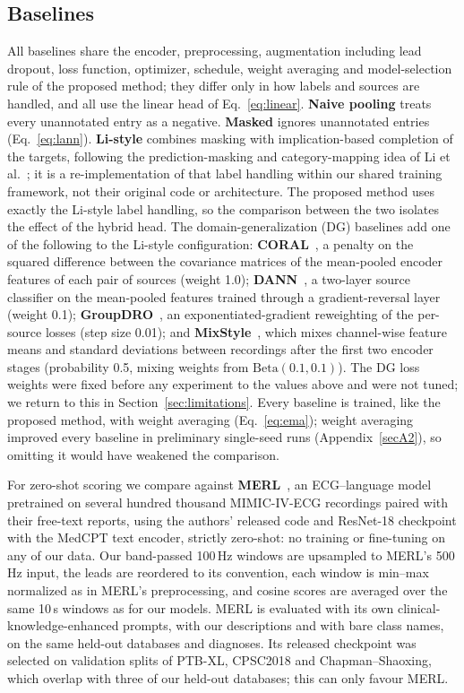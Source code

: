 \subsection{Baselines}\label{sec:baselines}
All baselines share the encoder, preprocessing, augmentation including lead dropout, loss function, optimizer, schedule, weight averaging and model-selection rule of the proposed method; they differ only in how labels and sources are handled, and all use the linear head of Eq.~\eqref{eq:linear}. \textbf{Naive pooling} treats every unannotated entry as a negative. \textbf{Masked} ignores unannotated entries (Eq.~\eqref{eq:lann}). \textbf{Li-style} combines masking with implication-based completion of the targets, following the prediction-masking and category-mapping idea of Li et al.~\cite{li2024}; it is a re-implementation of that label handling within our shared training framework, not their original code or architecture. The proposed method uses exactly the Li-style label handling, so the comparison between the two isolates the effect of the hybrid head. The domain-generalization (DG) baselines add one of the following to the Li-style configuration: \textbf{CORAL}~\cite{sun2016coral}, a penalty on the squared difference between the covariance matrices of the mean-pooled encoder features of each pair of sources (weight 1.0); \textbf{DANN}~\cite{ganin2016}, a two-layer source classifier on the mean-pooled features trained through a gradient-reversal layer (weight 0.1); \textbf{GroupDRO}~\cite{sagawa2020}, an exponentiated-gradient reweighting of the per-source losses (step size 0.01); and \textbf{MixStyle}~\cite{zhou2021mixstyle}, which mixes channel-wise feature means and standard deviations between recordings after the first two encoder stages (probability 0.5, mixing weights from $\mathrm{Beta}(0.1,0.1)$). The DG loss weights were fixed before any experiment to the values above and were not tuned; we return to this in Section~\ref{sec:limitations}. Every baseline is trained, like the proposed method, with weight averaging (Eq.~\eqref{eq:ema}); weight averaging improved every baseline in preliminary single-seed runs (Appendix~\ref{secA2}), so omitting it would have weakened the comparison.

For zero-shot scoring we compare against \textbf{MERL}~\cite{merl2024}, an ECG--language model pretrained on several hundred thousand MIMIC-IV-ECG recordings paired with their free-text reports, using the authors' released code and ResNet-18 checkpoint with the MedCPT text encoder, strictly zero-shot: no training or fine-tuning on any of our data. Our band-passed 100\,Hz windows are upsampled to MERL's 500\,Hz input, the leads are reordered to its convention, each window is min--max normalized as in MERL's preprocessing, and cosine scores are averaged over the same 10\,s windows as for our models. MERL is evaluated with its own clinical-knowledge-enhanced prompts, with our descriptions and with bare class names, on the same held-out databases and diagnoses. Its released checkpoint was selected on validation splits of PTB-XL, CPSC2018 and Chapman--Shaoxing, which overlap with three of our held-out databases; this can only favour MERL.

